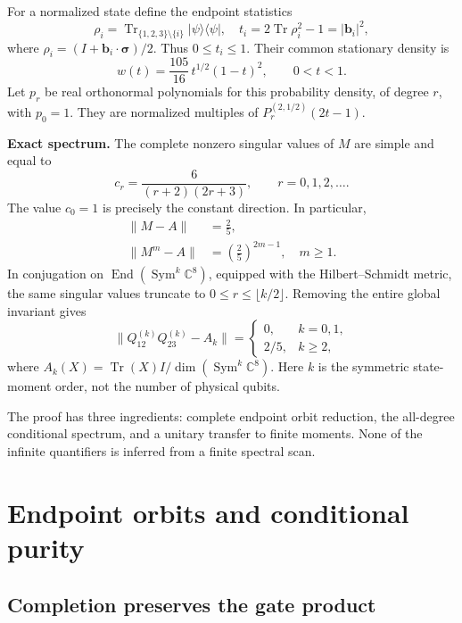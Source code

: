 \documentclass[aps,pra,reprint,amsmath,amssymb,longbibliography]{revtex4-2}
\newcommand{\C}{\mathbb C}
\newcommand{\Tr}{\operatorname{Tr}}
\newcommand{\Sym}{\operatorname{Sym}}
\newcommand{\End}{\operatorname{End}}
\newcommand{\ket}[1]{\lvert #1\rangle}
\newcommand{\bra}[1]{\langle #1\rvert}
\newcommand{\norm}[1]{\lVert #1\rVert}
\begin{document}
For a normalized state define the endpoint statistics
\begin{equation}
 \rho_i=\Tr_{\{1,2,3\}\setminus\{i\}}\ket\psi\bra\psi,
 \quad t_i=2\Tr\rho_i^2-1=|\bm b_i|^2,
\label{eq:t}
\end{equation}
where $\rho_i=(I+\bm b_i\cdot\bm\sigma)/2$. Thus $0\leq t_i\leq1$. Their common stationary density is
\begin{equation}
 w(t)=\frac{105}{16}\,t^{1/2}(1-t)^2,\qquad 0<t<1.
\label{eq:weight}
\end{equation}
Let $p_r$ be real orthonormal polynomials for this probability density, of degree $r$, with $p_0=1$. They are normalized multiples of $P_r^{(2,1/2)}(2t-1)$.

\textbf{Exact spectrum.} The complete nonzero singular values of $M$ are simple and equal to
\begin{equation}
 c_r=\frac{6}{(r+2)(2r+3)},\qquad r=0,1,2,\ldots .
\label{eq:spectrum}
\end{equation}
The value $c_0=1$ is precisely the constant direction. In particular,
\begin{align}
 \norm{M-A}&=\frac25,\nonumber\\
 \norm{M^m-A}&=\left(\frac25\right)^{2m-1},\quad m\geq1.
\label{eq:powers}
\end{align}
In conjugation on $\End(\Sym^k\C^8)$, equipped with the Hilbert--Schmidt metric, the same singular values truncate to $0\leq r\leq\lfloor k/2\rfloor$. Removing the entire global invariant gives
\begin{equation}
 \norm{Q_{12}^{(k)}Q_{23}^{(k)}-A_k}
 =\begin{cases}0,&k=0,1,\\[2pt]2/5,&k\geq2,\end{cases}
\label{eq:finite}
\end{equation}
where $A_k(X)=\Tr(X)I/\dim(\Sym^k\C^8)$. Here $k$ is the symmetric state-moment order, not the number of physical qubits.

The proof has three ingredients: complete endpoint orbit reduction, the all-degree conditional spectrum, and a unitary transfer to finite moments. None of the infinite quantifiers is inferred from a finite spectral scan.

\section{Endpoint orbits and conditional purity}
\label{sec:orbits}

\subsection{Completion preserves the gate product}
\end{document}

